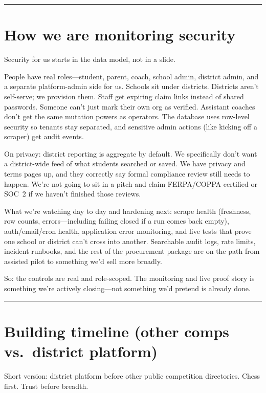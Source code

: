 \documentclass[11pt]{article}
\begin{document}
\vspace{0.5em}
\hrule
\vspace{1em}

\section*{How we are monitoring security}

Security for us starts in the data model, not in a slide.

People have real roles---student, parent, coach, school admin, district admin, and a separate platform-admin side for us. Schools sit under districts. Districts aren't self-serve; we provision them. Staff get expiring claim links instead of shared passwords. Someone can't just mark their own org as verified. Assistant coaches don't get the same mutation powers as operators. The database uses row-level security so tenants stay separated, and sensitive admin actions (like kicking off a scraper) get audit events.

On privacy: district reporting is aggregate by default. We specifically don't want a district-wide feed of what students searched or saved. We have privacy and terms pages up, and they correctly say formal compliance review still needs to happen. We're not going to sit in a pitch and claim FERPA/COPPA certified or SOC~2 if we haven't finished those reviews.

What we're watching day to day and hardening next: scrape health (freshness, row counts, errors---including failing closed if a run comes back empty), auth/email/cron health, application error monitoring, and live tests that prove one school or district can't cross into another. Searchable audit logs, rate limits, incident runbooks, and the rest of the procurement package are on the path from assisted pilot to something we'd sell more broadly.

So: the controls are real and role-scoped. The monitoring and live proof story is something we're actively closing---not something we'd pretend is already done.

\vspace{0.5em}
\hrule
\vspace{1em}

\section*{Building timeline (other comps vs.\ district platform)}

Short version: district platform before other public competition directories. Chess first. Trust before breadth.
\end{document}
